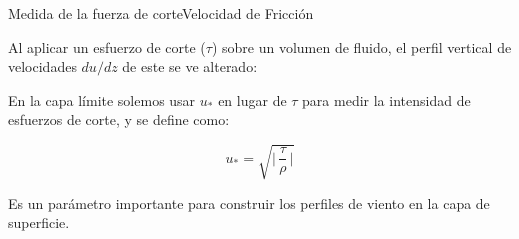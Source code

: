 \begin{frame}{Medida de la fuerza de corte}{Velocidad de Fricción}

Al aplicar un esfuerzo de corte ($\tau$) sobre un volumen de fluido, el perfil vertical de velocidades $du/dz$ de este se ve alterado:

    \begin{center}
    \end{center}

\pause

En la capa límite solemos usar $u_*$ en lugar de $\tau$ para medir la intensidad de esfuerzos de corte, y se define como:

$$\boxed{ u_* = \sqrt{\bigg|\, \dfrac{\tau}{\rho}\,\bigg|} }$$

Es un parámetro importante para construir los perfiles de viento en la capa de superficie.
\end{frame}


